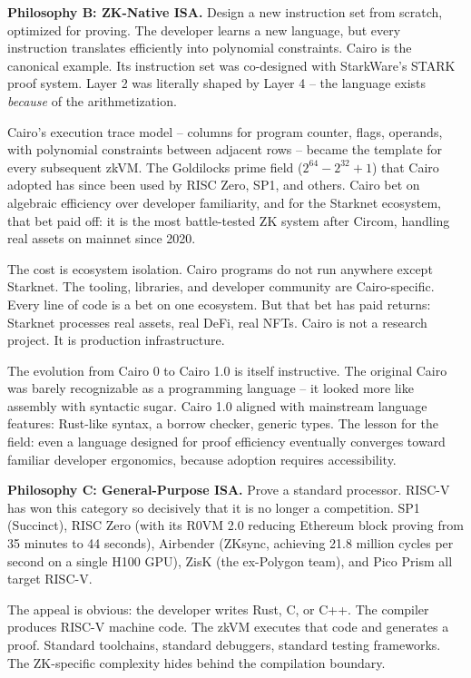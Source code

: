 \documentclass[
  11pt,
  openany]{report}
\renewcommand{\textbf}[1]{{\bfseries\color{MidnightBold}#1}}
\begin{document}
\textbf{Philosophy B: ZK-Native ISA.} Design a new instruction set from scratch,
optimized for proving. The developer learns a new language, but every
instruction translates efficiently into polynomial constraints. Cairo is the
canonical example. Its instruction set was co-designed with StarkWare's STARK
proof system. Layer 2 was literally shaped by Layer 4 -- the language exists
\emph{because} of the arithmetization.

Cairo's execution trace model -- columns for program counter, flags, operands,
with polynomial constraints between adjacent rows -- became the template for
every subsequent zkVM. The Goldilocks prime field (\(2^{64} - 2^{32} + 1\)) that
Cairo adopted has since been used by RISC Zero, SP1, and others. Cairo bet on
algebraic efficiency over developer familiarity, and for the Starknet ecosystem,
that bet paid off: it is the most battle-tested ZK system after Circom, handling
real assets on mainnet since 2020.

The cost is ecosystem isolation. Cairo programs do not run anywhere except
Starknet. The tooling, libraries, and developer community are Cairo-specific.
Every line of code is a bet on one ecosystem. But that bet has paid returns:
Starknet processes real assets, real DeFi, real NFTs. Cairo is not a research
project. It is production infrastructure.

The evolution from Cairo 0 to Cairo 1.0 is itself instructive. The original
Cairo was barely recognizable as a programming language -- it looked more like
assembly with syntactic sugar. Cairo 1.0 aligned with mainstream language
features: Rust-like syntax, a borrow checker, generic types. The lesson for the
field: even a language designed for proof efficiency eventually converges toward
familiar developer ergonomics, because adoption requires accessibility.

\textbf{Philosophy C: General-Purpose ISA.} Prove a standard processor. RISC-V
has won this category so decisively that it is no longer a competition. SP1
(Succinct), RISC Zero (with its R0VM 2.0 reducing Ethereum block proving from 35
minutes to 44 seconds), Airbender (ZKsync, achieving 21.8 million cycles per
second on a single H100 GPU), ZisK (the ex-Polygon team), and Pico Prism all
target RISC-V.

The appeal is obvious: the developer writes Rust, C, or C++. The compiler
produces RISC-V machine code. The zkVM executes that code and generates a proof.
Standard toolchains, standard debuggers, standard testing frameworks. The
ZK-specific complexity hides behind the compilation boundary.
\end{document}
